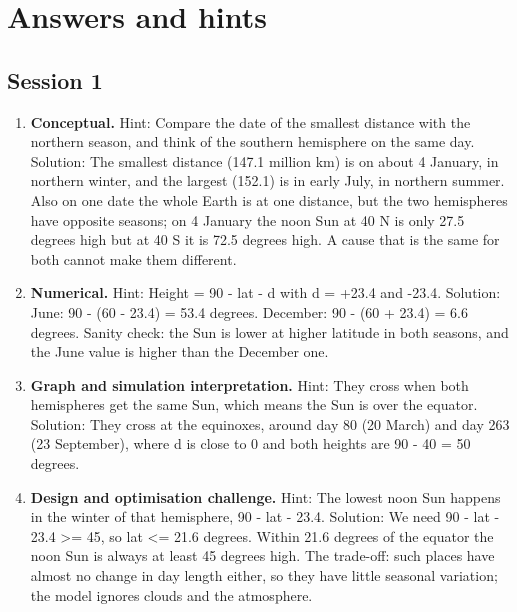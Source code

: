 \documentclass[11pt,a4paper]{article}
\begin{document}
\section{Answers and hints}

\subsection*{Session 1}
\begin{enumerate}[nosep]
\item \textbf{Conceptual.} Hint: Compare the date of the smallest distance with the northern season, and think of the southern hemisphere on the same day. Solution: The smallest distance (147.1 million km) is on about 4 January, in northern winter, and the largest (152.1) is in early July, in northern summer. Also on one date the whole Earth is at one distance, but the two hemispheres have opposite seasons; on 4 January the noon Sun at 40 N is only 27.5 degrees high but at 40 S it is 72.5 degrees high. A cause that is the same for both cannot make them different.
\item \textbf{Numerical.} Hint: Height = 90 - \textbar{}lat - d\textbar{} with d = +23.4 and -23.4. Solution: June: 90 - (60 - 23.4) = 53.4 degrees. December: 90 - (60 + 23.4) = 6.6 degrees. Sanity check: the Sun is lower at higher latitude in both seasons, and the June value is higher than the December one.
\item \textbf{Graph and simulation interpretation.} Hint: They cross when both hemispheres get the same Sun, which means the Sun is over the equator. Solution: They cross at the equinoxes, around day 80 (20 March) and day 263 (23 September), where d is close to 0 and both heights are 90 - 40 = 50 degrees.
\item \textbf{Design and optimisation challenge.} Hint: The lowest noon Sun happens in the winter of that hemisphere, 90 - lat - 23.4. Solution: We need 90 - lat - 23.4 \textgreater{}= 45, so lat \textless{}= 21.6 degrees. Within 21.6 degrees of the equator the noon Sun is always at least 45 degrees high. The trade-off: such places have almost no change in day length either, so they have little seasonal variation; the model ignores clouds and the atmosphere.
\end{enumerate}
\end{document}

